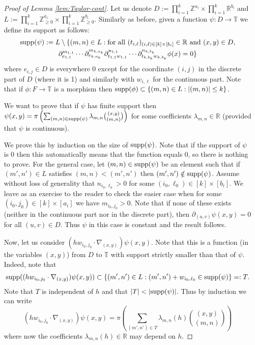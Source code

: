 \documentclass[a4paper,12pt,reqno]{amsart}
\theoremstyle{definition}
\def\supp{{\rm supp}}
\def\to{\rightarrow}
\newcommand{\mb}{\mathbb}
\begin{document}
\begin{proof}[Proof of Lemma \ref{lem:Taylor-cont}]
Let us denote $D:=\prod_{i=1}^k \mb{Z}^{a_i} \times \prod_{i=1}^k  \mb{R}^{b_i}$ and $L:=\prod_{i=1}^k \mb{Z}_{\ge 0}^{a_i}\times \prod_{i=1}^k \mb{Z}_{\ge 0}^{b_i}$.
Similarly as before, given a function $\psi:D\to \mb{T}$ we define its support as follows:
\begin{multline*}
\supp(\psi):=L\setminus\{(m,n)\in L: \text{for all }(t_{i,\ell})_{(i,\ell)\in[k]\times [b_i]}\in \mb{R} \text{ and } (x,y)\in D, \\ \partial_{e_{1,1}}^{m_{1,1}}\cdots \partial_{e_{k,a_k}}^{m_{k,a_k}}\partial_{t_{1,1}w_{1,1}}^{n_{1,1}}\cdots \partial_{t_{k,b_k}w_{k,b_k}}^{n_{k,b_k}}\phi(x)=0 \}
\end{multline*}
where $e_{i,j}\in D$ is everywhere 0 except for the coordinate $(i,j)$ in the discrete part of $D$ (where it is 1) and similarly with $w_{i,\ell}$ for the continuous part. Note that if $\phi:F\to \mb{T}$ is a morphism then $\supp(\phi)\subset \{(m,n)\in L:|(m,n)|\le k\}$.

We want to prove that if $\psi$ has finite support then $\psi(x,y)=\pi\left(\sum_{(m,n)\in \supp(\psi)}\lambda_{m,n} \binom{(x,y)}{(m,n)}\right)$ for some coefficients $\lambda_{m,n}\in \mb{R}$ (provided that $\psi$ is continuous).

We prove this by induction on the size of $\supp(\psi)$. Note that if the support of $\psi$ is 0 then this automatically means that the function equals 0, so there is nothing to prove. For the general case, let $(m,n)\in \supp(\psi)$ be an element such that if $(m',n')\in L$ satisfies $(m,n)<(m',n')$ then $(m',n')\notin \supp(\psi)$. Assume without loss of generality that $n_{i_0,\ell_0}>0$ for some $(i_0,\ell_0)\in[k]\times [b_i]$. We leave as an exercise to the reader to check the easier case when for some $(i_0,j_0)\in[k]\times[a_i]$ we have $m_{i_0,j_0}>0$. Note that if none of these exists (neither in the continuous part nor in the discrete part), then $\partial_{(u,v)}\psi(x,y)=0$ for all $(u,v)\in D$. Thus $\psi$ in this case is constant and the result follows.

Now, let us consider $(hw_{i_0,j_0}\cdot \nabla_{(x,y)})\psi(x,y)$. Note that this is a function (in the variables $(x,y)$) from $D$ to $\mb{T}$ with support strictly smaller than that of $\psi$. Indeed, note that \[\supp((hw_{i_0,j_0}\cdot \nabla_{(x,y)})\psi(x,y))\subset \{(m',n')\in L:(m',n')+w_{i_0,\ell_0}\in \supp(\psi)\}=:T.\] Note that $T$ is independent of $h$ and that $|T|<|\supp(\psi)|$. Thus by induction we can write
\begin{equation}\label{eq:form-deri}
(hw_{i_0,j_0}\cdot \nabla_{(x,y)})\psi(x,y)=\pi\left(\sum_{(m',n')\in T}\lambda_{m,n}(h) \binom{(x,y)}{(m,n)}\right)
\end{equation}
where now the coefficients $\lambda_{m,n}(h)\in \mb{R}$ may depend on $h$.


\end{proof}
\end{document}
